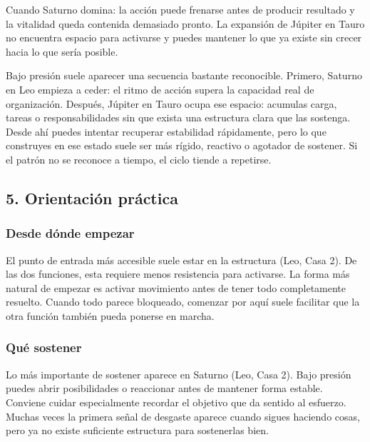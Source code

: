 \documentclass[11pt,a4paper]{article}
\begin{document}
Cuando Saturno domina: la acción puede frenarse antes de producir resultado y la vitalidad queda contenida demasiado pronto. La expansión de Júpiter en Tauro no encuentra espacio para activarse y puedes mantener lo que ya existe sin crecer hacia lo que sería posible.

Bajo presión suele aparecer una secuencia bastante reconocible. Primero, Saturno en Leo empieza a ceder: el ritmo de acción supera la capacidad real de organización. Después, Júpiter en Tauro ocupa ese espacio: acumulas carga, tareas o responsabilidades sin que exista una estructura clara que las sostenga. Desde ahí puedes intentar recuperar estabilidad rápidamente, pero lo que construyes en ese estado suele ser más rígido, reactivo o agotador de sostener. Si el patrón no se reconoce a tiempo, el ciclo tiende a repetirse.

\vspace{0.8cm}


\subsection{5. Orientación práctica}

\subsubsection*{Desde dónde empezar}

El punto de entrada más accesible suele estar en la estructura (Leo, Casa 2). De las dos funciones, esta requiere menos resistencia para activarse. La forma más natural de empezar es activar movimiento antes de tener todo completamente resuelto. Cuando todo parece bloqueado, comenzar por aquí suele facilitar que la otra función también pueda ponerse en marcha.

\subsubsection*{Qué sostener}

Lo más importante de sostener aparece en Saturno (Leo, Casa 2). Bajo presión puedes abrir posibilidades o reaccionar antes de mantener forma estable. Conviene cuidar especialmente recordar el objetivo que da sentido al esfuerzo. Muchas veces la primera señal de desgaste aparece cuando sigues haciendo cosas, pero ya no existe suficiente estructura para sostenerlas bien.
\end{document}
